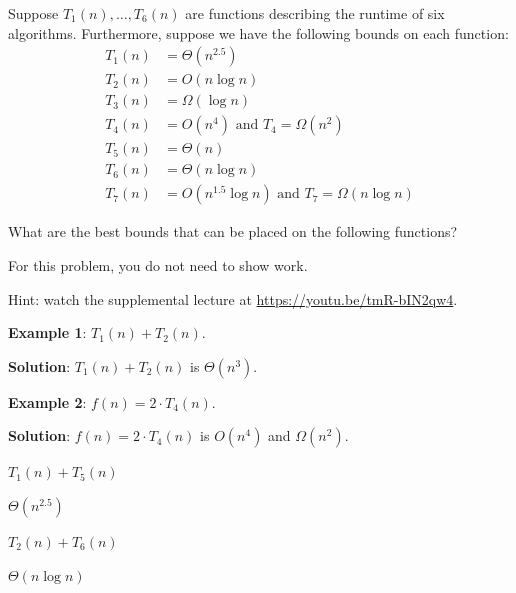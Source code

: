 \begin{prob}

    Suppose $T_1(n), \ldots, T_6(n)$ are functions
    describing the runtime of six algorithms. Furthermore, suppose we
    have the following bounds on each function:
    \begin{align*}
        T_1(n) &= \Theta(n^{2.5})\\
        T_2(n) &= O(n \log n)\\
        T_3(n) &= \Omega(\log n)\\
        T_4(n) &= O(n^4) \text{ and } T_4 = \Omega(n^2)\\
        T_5(n) &= \Theta(n)\\
        T_6(n) &= \Theta(n \log{n})\\
        T_7(n) &= O(n^{1.5} \log n) \text{ and } T_7 = \Omega(n \log{n})
    \end{align*}

    What are the best bounds that can be placed on the following functions?

    For this problem, you do not need to show work.

    Hint: watch the supplemental lecture at \url{https://youtu.be/tmR-bIN2qw4}.

    \textbf{Example 1}: $T_1(n) + T_2(n)$.

    \textbf{Solution}: $T_1(n) + T_2(n)$ is $\Theta(n^3)$.
    
    \textbf{Example 2}: $f(n) = 2 \cdot T_4(n)$.

    \textbf{Solution}: $f(n) = 2 \cdot T_4(n)$ is $O(n^4)$ and $\Omega(n^2)$.



    \begin{subprobset}

        \begin{subprob}
            $T_1(n) + T_5(n)$

            \begin{soln}
                $\Theta(n^{2.5})$
            \end{soln}
        \end{subprob}

        \begin{subprob}
            $T_2(n) + T_6(n)$

            \begin{soln}
                $\Theta(n \log n)$
            \end{soln}
        \end{subprob}


\end{subprobset}
\end{prob}
